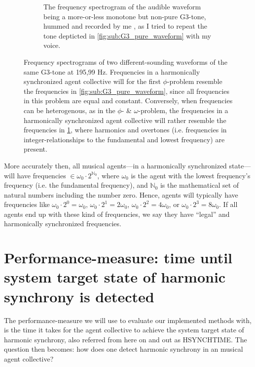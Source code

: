 \begin{figure}[ht!]
\begin{subfigure}[t]{.5\textwidth}
			\caption{The frequency spectrogram of the audible waveform being a more-or-less monotone but non-pure G3-tone, hummed and recorded by me \cite{}, as I tried to repeat the tone depticted in \ref{fig:sub:G3_pure_waveform} with my voice.}
			\label{fig:sub:G3_hummed_waveform}
		\end{subfigure}
	\caption{Frequency spectrograms of two different-sounding waveforms of the same G3-tone at 195,99 Hz. Frequencies in a harmonically synchronized agent collective will for the first $\phi$-problem resemble the frequencies in \ref{fig:sub:G3_pure_waveform}, since all frequencies in this problem are equal and constant. Conversely, when frequencies can be heterogenous, as in the $\phi$- \& $\omega$-problem, the frequencies in a harmonically synchronized agent collective will rather resemble the frequencies in \ref{fig:sub:G3_hummed_waveform}, where harmonics and overtones (i.e. frequencies in integer-relationships to the fundamental and lowest frequency) are present.}
	\label{fig:frequency_spectrograms}
\end{figure}


More accurately then, all musical agents—in a harmonically synchronized state—will have frequencies $\in \omega_{0} \cdot 2^{\mathbb{N}_0}$, where $\omega_{0}$ is the agent with the lowest frequency's frequency (i.e. the fundamental frequency), and $\mathbb{N}_0$ is the mathematical set of natural numbers including the number zero. Hence, agents will typically have frequencies like $\omega_{0} \cdot 2^0 = \omega_{0}$, $\omega_{0} \cdot 2^1 = 2\omega_{0}$, $\omega_{0} \cdot 2^2 = 4\omega_{0}$, or $\omega_{0} \cdot 2^3 = 8\omega_{0}$. If all agents end up with these kind of frequencies, we say they have ``legal'' and harmonically synchronized frequencies.







\section{Performance-measure: time until system target state of harmonic synchrony is detected}
\label{sec:performance_measure}

The performance-measure we will use to evaluate our implemented methods with, is the time it takes for the agent collective to achieve the system target state of harmonic synchrony, also referred from here on and out as HSYNCHTIME. The question then becomes: how does one detect harmonic synchrony in an musical agent collective?

